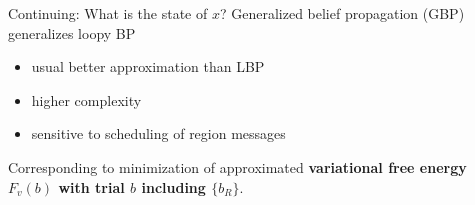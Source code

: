 \begin{frame}{Continuing: What is the state of $x$?}
  Generalized belief propagation (GBP) generalizes loopy BP
  \begin{itemize}[label={$\bullet$}]
  \item usual better approximation than LBP
  \item higher complexity
  \item sensitive to scheduling of region messages
  \end{itemize}
  Corresponding to minimization of approximated \textbf{variational free energy $F_v(b)$  with trial $b$ including $\{b_R\}$}.
  \let\thefootnote\relax{}
\end{frame}

